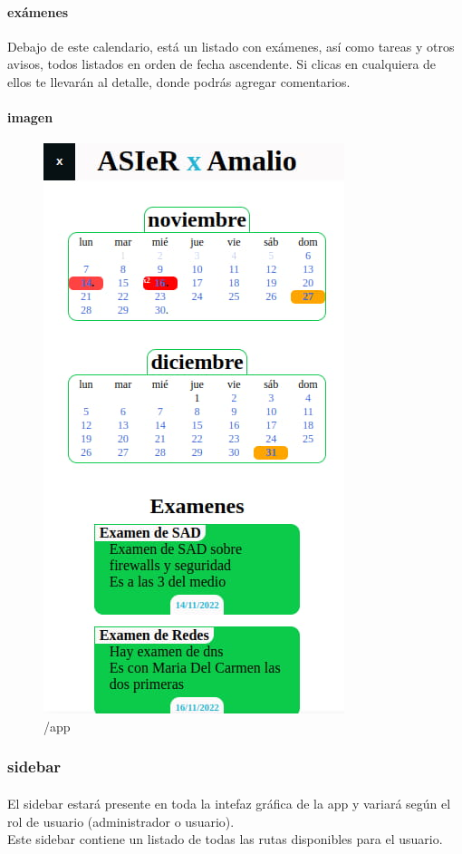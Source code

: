 \documentclass[a4paper]{article}
\begin{document}
\paragraph{exámenes}
Debajo de este calendario, está un listado con exámenes, así como tareas y otros avisos, todos 
listados en orden de fecha ascendente. Si clicas en cualquiera de ellos te llevarán al detalle, donde 
podrás agregar comentarios.
\paragraph{imagen}
\begin{figure}[ht]
   \includegraphics[scale=0.5]{./assets/app.jpg}
   \centering
   \caption{/app}
   \label{fig:app}
\end{figure}
\newpage
\subsubsection{sidebar}
\paragraph{}
El sidebar estará presente en toda la intefaz gráfica de la app y variará según el rol de usuario 
(administrador o usuario).\\ Este sidebar contiene un listado de todas las rutas disponibles para 
el usuario.
\end{document}
